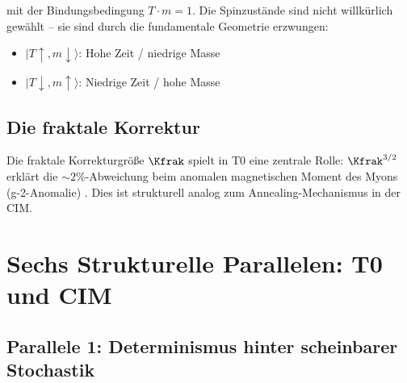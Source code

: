 mit der Bindungsbedingung $T \cdot m = 1$. Die Spinzustände sind nicht willkürlich 
gewählt -- sie sind durch die fundamentale Geometrie erzwungen:

\begin{itemize}
    \item $|T{\uparrow}, m{\downarrow}\rangle$: Hohe Zeit / niedrige Masse 
    \item $|T{\downarrow}, m{\uparrow}\rangle$: Niedrige Zeit / hohe Masse
\end{itemize}

\subsection{Die fraktale Korrektur}

Die fraktale Korrekturgröße $\Kfrak$ spielt in T0 eine zentrale Rolle: 
$\Kfrak^{3/2}$ erklärt die $\sim 2\%$-Abweichung beim anomalen magnetischen 
Moment des Myons (g-2-Anomalie) \cite{pascher_g2_2025}. Dies ist strukturell 
analog zum Annealing-Mechanismus in der CIM.

\clearpage

\section{Sechs Strukturelle Parallelen: T0 und CIM}
\label{sec:parallels}

\subsection{Parallele 1: Determinismus hinter scheinbarer Stochastik}

\begin{table}[h]
    \centering
    \caption{Parallele 1: Determinismus}
    \label{tab:parallel1}
\end{table}

